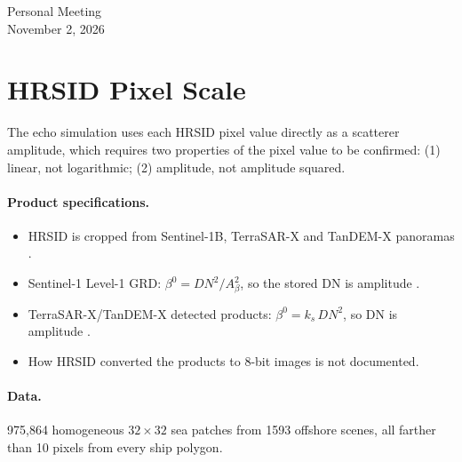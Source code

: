 \documentclass[11pt,a4paper]{article}
\begin{document}
\begin{center}
{\LARGE Personal Meeting}\\[0.4em]
{\large November 2, 2026}
\end{center}

\section{HRSID Pixel Scale}

The echo simulation uses each HRSID pixel value directly as a scatterer amplitude, which requires two properties
of the pixel value to be confirmed: (1) linear, not logarithmic; (2) amplitude, not amplitude squared.

\paragraph{Product specifications.}
\begin{itemize}
  \item HRSID is cropped from Sentinel-1B, TerraSAR-X and TanDEM-X panoramas \cite{hrsid}.
  \item Sentinel-1 Level-1 GRD: $\beta^0 = DN^2/A_\beta^2$, so the stored DN is amplitude \cite{s1cal}.
  \item TerraSAR-X/TanDEM-X detected products: $\beta^0 = k_s\,DN^2$, so DN is amplitude \cite{tsxcal}.
  \item How HRSID converted the products to 8-bit images is not documented.
\end{itemize}

\paragraph{Data.} 975,864 homogeneous $32\times32$ sea patches from 1593 offshore scenes, all farther than 10 pixels from every
ship polygon.
\end{document}
